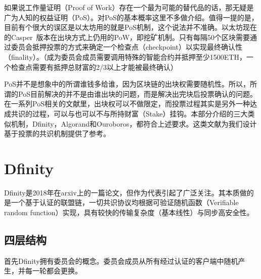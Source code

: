 如果说工作量证明（Proof of Work）存在一个最为可能的替代品的话，那无疑是广为人知的权益证明（PoS）。对PoS的基本概率这里不多做介绍。值得一提的是，目前有个很大的误区是以太坊用的就是PoS机制，这个说法并不准确。以太坊现在的Casper~\cite{buterin2017casper}版本在出块方式上仍用的PoW，即挖矿机制。只有每隔50个区块需要通过委员会抵押投票的方式来确定一个检查点（checkpoint）以实现最终确认性（finality）。（成为委员会成员需要调用特殊的智能合约并抵押至少1500ETH，一个检查点需要有抵押总财富的2/3以上才能被最终确认）

PoS并不是想象中的所谓谁钱多给谁，因为区块链的出块权需要随机性。所以，所谓的PoS目前解决的并不是由谁出块的问题，而是解决出完块后投票确认的问题。在一系列PoS相关的文献里，出块权可以不做限定，而投票过程其实是另外一种达成共识的过程，可以与也可以不与所持财富（Stake）挂钩。本部分介绍的三大类似机制，Dfinity，Algorand和Ouroboros，都符合上述要求。这类文献为我们设计基于投票的共识机制提供了参考。

\section{Dfinity}
Dfinity是2018年在arxiv上的一篇论文，但作为代表引起了广泛关注。其本质做的是一个基于认证的联盟链，一切共识协议均根据可验证随机函数（Verifiable random function）实现，具有较快的传输复杂度（基本线性）与同步高安全性。
\subsection{四层结构}
首先Dfinity拥有委员会的概念。委员会成员从所有经过认证的客户端中随机产生，并每一轮都会更换。

